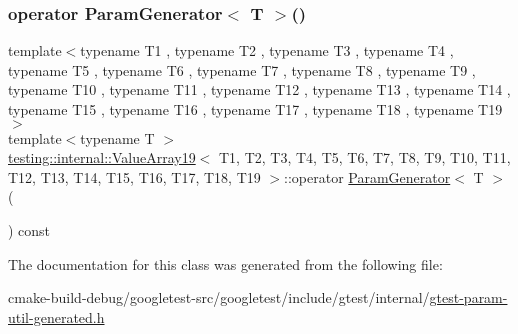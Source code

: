 \subsubsection{\texorpdfstring{operator ParamGenerator$<$ T $>$()}{operator ParamGenerator< T >()}}
{\footnotesize\ttfamily template$<$typename T1 , typename T2 , typename T3 , typename T4 , typename T5 , typename T6 , typename T7 , typename T8 , typename T9 , typename T10 , typename T11 , typename T12 , typename T13 , typename T14 , typename T15 , typename T16 , typename T17 , typename T18 , typename T19 $>$ \\
template$<$typename T $>$ \\
\mbox{\hyperlink{classtesting_1_1internal_1_1ValueArray19}{testing\+::internal\+::\+Value\+Array19}}$<$ T1, T2, T3, T4, T5, T6, T7, T8, T9, T10, T11, T12, T13, T14, T15, T16, T17, T18, T19 $>$\+::operator \mbox{\hyperlink{classtesting_1_1internal_1_1ParamGenerator}{Param\+Generator}}$<$ T $>$ (\begin{DoxyParamCaption}{ }\end{DoxyParamCaption}) const\hspace{0.3cm}{\ttfamily [inline]}}



The documentation for this class was generated from the following file\+:\begin{DoxyCompactItemize}
\item 
cmake-\/build-\/debug/googletest-\/src/googletest/include/gtest/internal/\mbox{\hyperlink{gtest-param-util-generated_8h}{gtest-\/param-\/util-\/generated.\+h}}\end{DoxyCompactItemize}
